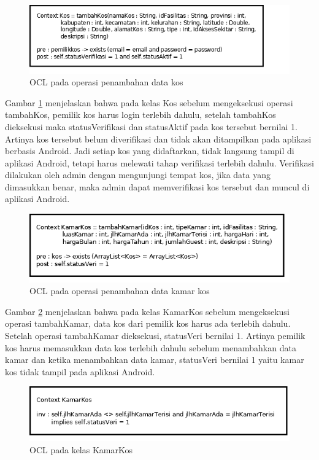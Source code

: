 	\begin{figure}[H]
		\centering
		\includegraphics[scale=0.7]{gambar/ocl/tambahKos}
		\caption{OCL pada operasi penambahan data kos}
		\label{ocl1}
	\end{figure}

	Gambar \ref{ocl1} menjelaskan bahwa pada kelas Kos sebelum mengeksekusi operasi tambahKos, pemilik kos harus login terlebih dahulu, setelah tambahKos dieksekusi maka statusVerifikasi dan statusAktif pada kos tersebut bernilai 1. Artinya kos tersebut belum diverifikasi dan tidak akan ditampilkan pada aplikasi berbasis Android. Jadi setiap kos yang didaftarkan, tidak langsung tampil di aplikasi Android, tetapi harus melewati tahap verifikasi terlebih dahulu. Verifikasi dilakukan oleh admin dengan mengunjungi tempat kos, jika data yang dimasukkan benar, maka admin dapat memverifikasi kos tersebut dan muncul di aplikasi Android.
	
	\begin{figure}[H]
		\centering
		\includegraphics[scale=0.7]{gambar/ocl/tambahKamar}
		\caption{OCL pada operasi penambahan data kamar kos}
		\label{ocl2}
	\end{figure}

	Gambar \ref{ocl2} menjelaskan bahwa pada kelas KamarKos sebelum mengeksekusi operasi tambahKamar, data kos dari pemilik kos harus ada terlebih dahulu. Setelah operasi tambahKamar dieksekusi, statusVeri bernilai 1. Artinya pemilik kos harus memasukkan data kos terlebih dahulu sebelum menambahkan data kamar dan ketika menambahkan data kamar, statusVeri bernilai 1 yaitu kamar kos tidak tampil pada aplikasi Android. 
	
	\begin{figure}[H]
		\centering
		\includegraphics[scale=0.5]{gambar/ocl/KamarKos}
		\caption{OCL pada kelas KamarKos}
		\label{ocl3}
	\end{figure}

